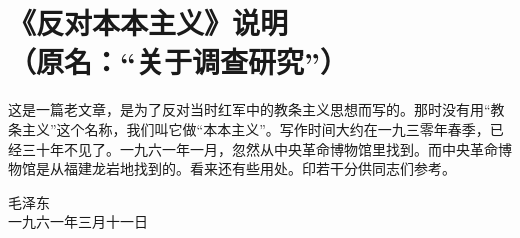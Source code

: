 \section[《反对本本主义》说明（一九六一年三月十一日）]{《反对本本主义》说明\\{\large（原名：“关于调查研究”）}}

这是一篇老文章，是为了反对当时红军中的教条主义思想而写的。那时没有用“教条主义”这个名称，我们叫它做“本本主义”。写作时间大约在一九三零年春季，已经三十年不见了。一九六一年一月，忽然从中央革命博物馆里找到。而中央革命博物馆是从福建龙岩地找到的。看来还有些用处。印若干分供同志们参考。

{\raggedleft 毛泽东\\一九六一年三月十一日\par}


